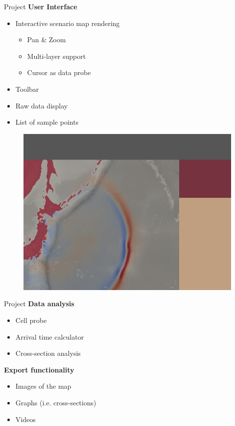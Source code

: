\documentclass[shortpres,usenames,dvipsnames]{beamer}
\begin{document}
\begin{frame}{Project}
	\textbf{User Interface}
	\begin{multicols}{2}
		\begin{itemize}
			\item Interactive scenario map rendering
			\begin{itemize}
				\item Pan \& Zoom
				\item Multi-layer support
				\item Cursor as data probe
			\end{itemize}
			\item \textcolor{guitoolbar}{Toolbar}
			\item \textcolor{guidata}{Raw data display}
			\item \textcolor{guiexport}{List of sample points}
		\end{itemize}
		
	\columnbreak
		\centering
		\begin{figure}
			\includegraphics[clip,width=\linewidth]{img/GUI.png}
		\end{figure}	
	\end{multicols}
\end{frame}

\begin{frame}{Project}
	\textbf{Data analysis}
	\begin{itemize}
		\item Cell probe
		\item Arrival time calculator
		\item Cross-section analysis
	\end{itemize}
	\vspace{10pt}
	\textbf{Export functionality}
	\begin{itemize}
		\item Images of the map
		\item Graphs (i.e. cross-sections)
		\item Videos
	\end{itemize}
\end{frame}
\end{document}
